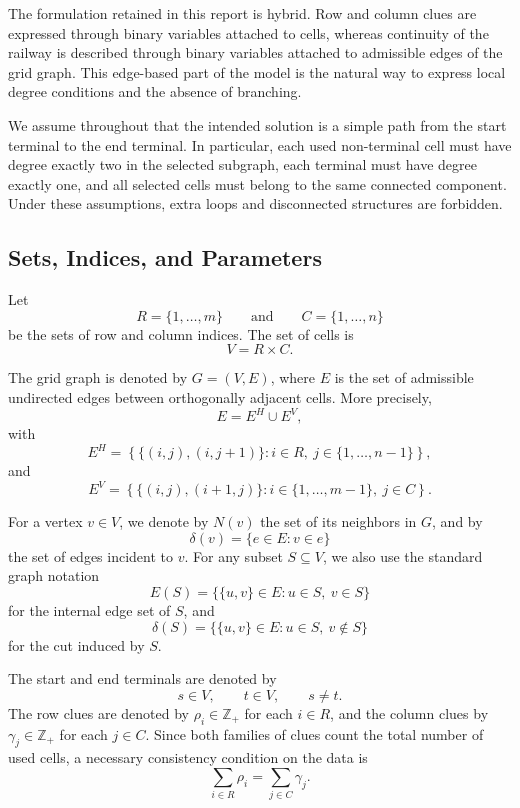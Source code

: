 The formulation retained in this report is hybrid. Row and column clues are expressed through binary variables attached to cells, whereas continuity of the railway is described through binary variables attached to admissible edges of the grid graph. This edge-based part of the model is the natural way to express local degree conditions and the absence of branching.

We assume throughout that the intended solution is a simple path from the start terminal to the end terminal. In particular, each used non-terminal cell must have degree exactly two in the selected subgraph, each terminal must have degree exactly one, and all selected cells must belong to the same connected component. Under these assumptions, extra loops and disconnected structures are forbidden.

\subsection{Sets, Indices, and Parameters}

Let
\[
    R = \{1,\dots,m\}
    \qquad \text{and} \qquad
    C = \{1,\dots,n\}
\]
be the sets of row and column indices. The set of cells is
\[
    V = R \times C.
\]

The grid graph is denoted by \(G=(V,E)\), where \(E\) is the set of admissible undirected edges between orthogonally adjacent cells. More precisely,
\[
    E = E^H \cup E^V,
\]
with
\[
    E^H =
    \left\{
        \{(i,j),(i,j+1)\} :
        i \in R,\ j \in \{1,\dots,n-1\}
    \right\},
\]
and
\[
    E^V =
    \left\{
        \{(i,j),(i+1,j)\} :
        i \in \{1,\dots,m-1\},\ j \in C
    \right\}.
\]

For a vertex \(v \in V\), we denote by \(N(v)\) the set of its neighbors in \(G\), and by
\[
    \delta(v) = \{e \in E : v \in e\}
\]
the set of edges incident to \(v\). For any subset \(S \subseteq V\), we also use the standard graph notation
\[
    E(S) = \{\{u,v\} \in E : u \in S,\ v \in S\}
\]
for the internal edge set of \(S\), and
\[
    \delta(S) = \{\{u,v\} \in E : u \in S,\ v \notin S\}
\]
for the cut induced by \(S\).

The start and end terminals are denoted by
\[
    s \in V, \qquad t \in V, \qquad s \neq t.
\]
The row clues are denoted by \(\rho_i \in \mathbb{Z}_{+}\) for each \(i \in R\), and the column clues by \(\gamma_j \in \mathbb{Z}_{+}\) for each \(j \in C\). Since both families of clues count the total number of used cells, a necessary consistency condition on the data is
\[
    \sum_{i \in R} \rho_i = \sum_{j \in C} \gamma_j.
\]


